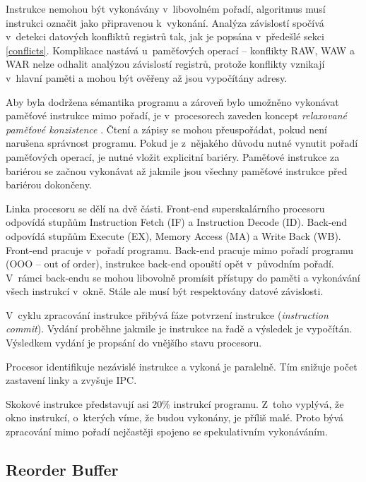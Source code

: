 Instrukce nemohou být vykonávány v~libovolném pořadí, algoritmus musí instrukci označit jako připravenou k~vykonání.
Analýza závislostí spočívá v~detekci datových konfliktů registrů tak, jak je popsána v~předešlé sekci \ref{conflicts}.
Komplikace nastává u~paměťových operací -- konflikty RAW, WAW a WAR nelze odhalit analýzou závislostí registrů, protože konflikty vznikají v~hlavní paměti a mohou být ověřeny až jsou vypočítány adresy. 

Aby byla dodržena sémantika programu a zároveň bylo umožněno vykonávat paměťové instrukce mimo pořadí, je v~procesorech zaveden koncept \emph{relaxované paměťové konzistence} \cite{avs}.
Čtení a zápisy se mohou přeuspořádat, pokud není narušena správnost programu.
Pokud je z~nějakého důvodu nutné vynutit pořadí paměťových operací, je nutné vložit explicitní bariéry.
Paměťové instrukce za bariérou se začnou vykonávat až jakmile jsou všechny paměťové instrukce před bariérou dokončeny.

Linka procesoru se dělí na dvě části. 
Front-end superskalárního procesoru odpovídá stupňům Instruction Fetch (IF) a Instruction Decode (ID).
Back-end odpovídá stupňům Execute (EX), Memory Access (MA) a Write Back (WB).
Front-end pracuje v~pořadí programu.
Back-end pracuje mimo pořadí programu (OOO -- out of order), instrukce back-end opouští opět v~původním pořadí.
V~rámci back-endu se mohou libovolně promísit přístupy do paměti a vykonávání všech instrukcí v~okně. Stále ale musí být respektovány datové závislosti.

V~cyklu zpracování instrukce přibývá fáze potvrzení instrukce (\emph{instruction commit}).
Vydání proběhne jakmile je instrukce na řadě a výsledek je vypočítán.
Výsledkem vydání je propsání do vnějšího stavu procesoru.

Procesor identifikuje nezávislé instrukce a vykoná je paralelně.
Tím snižuje počet zastavení linky a zvyšuje IPC.

Skokové instrukce představují asi 20\% instrukcí programu.
Z~toho vyplývá, že okno instrukcí, o~kterých víme, že budou vykonány, je příliš malé.
Proto bývá zpracování mimo pořadí nejčastěji spojeno se spekulativním vykonáváním. 


\subsection{Reorder Buffer}

